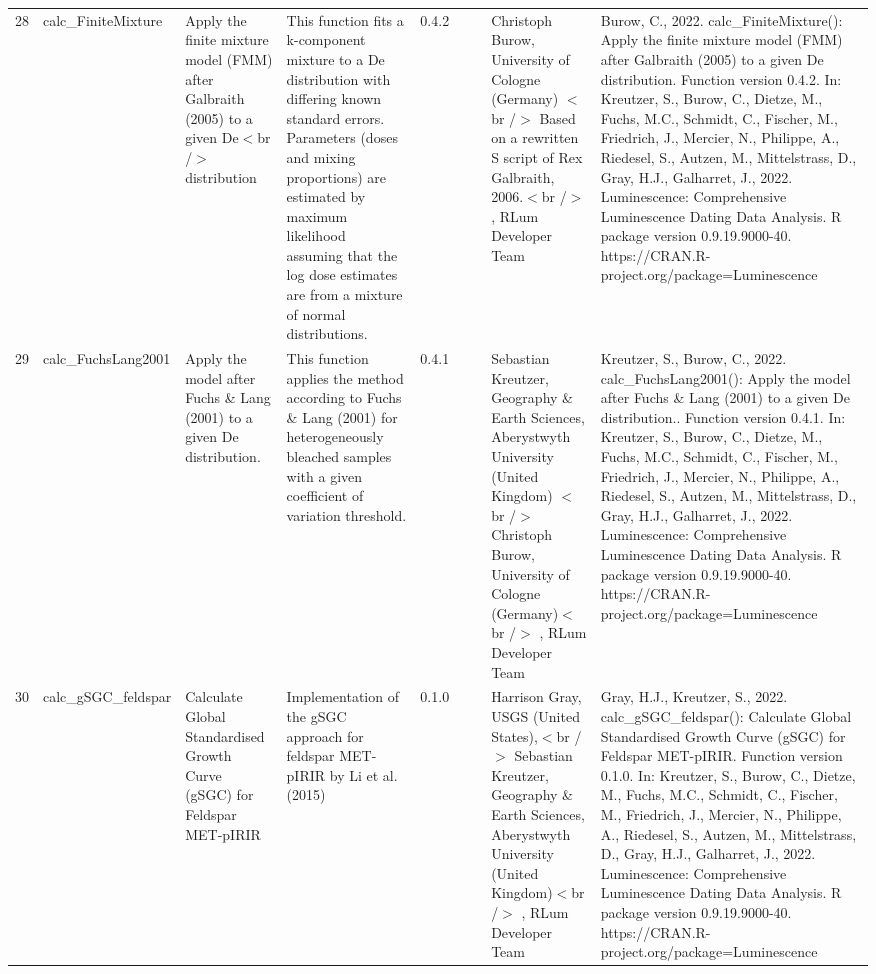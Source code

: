 \begin{table}[ht]
\begin{tabular}{rllllllll}
 \\ 
  28 & calc\_FiniteMixture & Apply the finite mixture model (FMM) after Galbraith (2005) to a given De$<$br /$>$ distribution & This function fits a k-component mixture to a De distribution with differing known standard errors. Parameters (doses and mixing proportions) are estimated by maximum likelihood assuming that the log dose estimates are from a mixture of normal distributions. & 0.4.2
 &  &  & Christoph Burow, University of Cologne (Germany)  $<$br /$>$ Based on a rewritten S script of Rex Galbraith, 2006.$<$br /$>$ , RLum Developer Team & Burow, C., 2022. calc\_FiniteMixture(): Apply the finite mixture model (FMM) after Galbraith (2005) to a given De distribution. Function version 0.4.2. In: Kreutzer, S., Burow, C., Dietze, M., Fuchs, M.C., Schmidt, C., Fischer, M., Friedrich, J., Mercier, N., Philippe, A., Riedesel, S., Autzen, M., Mittelstrass, D., Gray, H.J., Galharret, J., 2022. Luminescence: Comprehensive Luminescence Dating Data Analysis. R package version 0.9.19.9000-40. https://CRAN.R-project.org/package=Luminescence
 \\ 
  29 & calc\_FuchsLang2001 & Apply the model after Fuchs \& Lang (2001) to a given De distribution. & This function applies the method according to Fuchs \& Lang (2001) for heterogeneously bleached samples with a given coefficient of variation threshold. & 0.4.1
 &  &  & Sebastian Kreutzer, Geography \& Earth Sciences, Aberystwyth University (United Kingdom)  $<$br /$>$ Christoph Burow, University of Cologne (Germany)$<$br /$>$ , RLum Developer Team & Kreutzer, S., Burow, C., 2022. calc\_FuchsLang2001(): Apply the model after Fuchs \& Lang (2001) to a given De distribution.. Function version 0.4.1. In: Kreutzer, S., Burow, C., Dietze, M., Fuchs, M.C., Schmidt, C., Fischer, M., Friedrich, J., Mercier, N., Philippe, A., Riedesel, S., Autzen, M., Mittelstrass, D., Gray, H.J., Galharret, J., 2022. Luminescence: Comprehensive Luminescence Dating Data Analysis. R package version 0.9.19.9000-40. https://CRAN.R-project.org/package=Luminescence
 \\ 
  30 & calc\_gSGC\_feldspar & Calculate Global Standardised Growth Curve (gSGC) for Feldspar MET-pIRIR & Implementation of the gSGC approach for feldspar MET-pIRIR by Li et al. (2015) & 0.1.0
 &  &  & Harrison Gray, USGS (United States),$<$br /$>$ Sebastian Kreutzer, Geography \& Earth Sciences, Aberystwyth University (United Kingdom)$<$br /$>$ , RLum Developer Team & Gray, H.J., Kreutzer, S., 2022. calc\_gSGC\_feldspar(): Calculate Global Standardised Growth Curve (gSGC) for Feldspar MET-pIRIR. Function version 0.1.0. In: Kreutzer, S., Burow, C., Dietze, M., Fuchs, M.C., Schmidt, C., Fischer, M., Friedrich, J., Mercier, N., Philippe, A., Riedesel, S., Autzen, M., Mittelstrass, D., Gray, H.J., Galharret, J., 2022. Luminescence: Comprehensive Luminescence Dating Data Analysis. R package version 0.9.19.9000-40. https://CRAN.R-project.org/package=Luminescence

\end{tabular}
\end{table}
